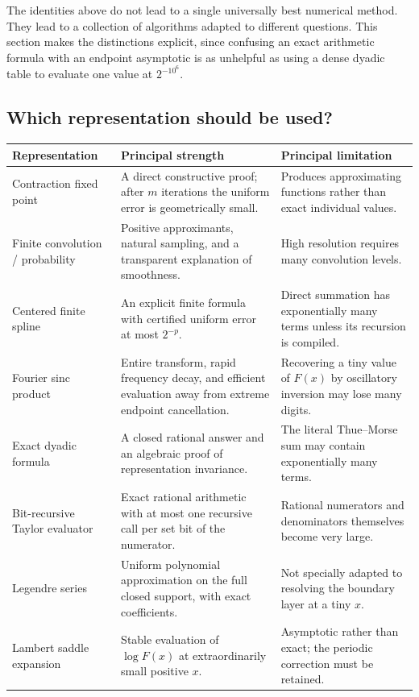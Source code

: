 \documentclass[11pt,oneside]{article}
\theoremstyle{definition}
\theoremstyle{remark}
\begin{document}
The identities above do not lead to a single universally best numerical method.  They lead to
a collection of algorithms adapted to different questions.  This section makes the
distinctions explicit, since confusing an exact arithmetic formula with an endpoint
asymptotic is as unhelpful as using a dense dyadic table to evaluate one value at
$2^{-10^6}$.

\subsection{Which representation should be used?}

\begin{center}
\begin{tabularx}{0.96\textwidth}{@{}>{\raggedright\arraybackslash}p{}>{\raggedright\arraybackslash}X>{\raggedright\arraybackslash}X@{}}
\toprule
Representation & Principal strength & Principal limitation\\
\midrule
Contraction fixed point &
A direct constructive proof; after $m$ iterations the uniform error is geometrically small. &
Produces approximating functions rather than exact individual values.\\
Finite convolution / probability &
Positive approximants, natural sampling, and a transparent explanation of smoothness. &
High resolution requires many convolution levels.\\
Centered finite spline &
An explicit finite formula with certified uniform error at most $2^{-p}$. &
Direct summation has exponentially many terms unless its recursion is compiled.\\
Fourier sinc product &
Entire transform, rapid frequency decay, and efficient evaluation away from extreme
endpoint cancellation. &
Recovering a tiny value of $F(x)$ by oscillatory inversion may lose many digits.\\
Exact dyadic formula &
A closed rational answer and an algebraic proof of representation invariance. &
The literal Thue--Morse sum may contain exponentially many terms.\\
Bit-recursive Taylor evaluator &
Exact rational arithmetic with at most one recursive call per set bit of the numerator. &
Rational numerators and denominators themselves become very large.\\
Legendre series &
Uniform polynomial approximation on the full closed support, with exact coefficients. &
Not specially adapted to resolving the boundary layer at a tiny $x$.\\
Lambert saddle expansion &
Stable evaluation of $\log F(x)$ at extraordinarily small positive $x$. &
Asymptotic rather than exact; the periodic correction must be retained.\\
\bottomrule
\end{tabularx}
\end{center}
\end{document}
